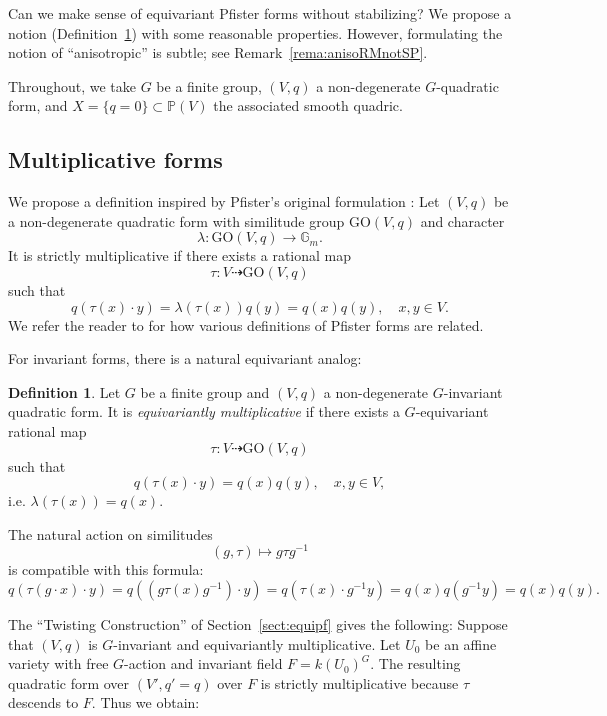 \documentclass[12pt]{amsart}
\numberwithin{equation}{section}
\newcommand{\ra}{\rightarrow}
\newcommand{\bG}{\mathbb{G}}
\newcommand{\bP}{\mathbb{P}}
\newcommand{\GO}{\mathrm{GO}}
\theoremstyle{plain}
\theoremstyle{definition}
\newtheorem{defi}[prop]{Definition}
\theoremstyle{remark}
\begin{document}
Can we make sense of equivariant Pfister forms without
stabilizing? We propose a notion (Definition~\ref{defn:equmult}) with some reasonable
properties. However, formulating the notion of ``anisotropic''
is subtle; see Remark~\ref{rema:anisoRMnotSP}.

Throughout, we take $G$ be a finite group, $(V,q)$ a non-degenerate $G$-quadratic form, and
$
X=\{q=0\}\subset \bP(V)
$ 
the associated smooth quadric. 





\subsection*{Multiplicative forms}
We propose a definition inspired by
Pfister's original formulation \cite[ch.~2]{Pfisterbook}:
Let $(V,q)$ be a non-degenerate quadratic form with similitude group
$\GO(V,q)$ and character 
$$
\lambda: \GO(V,q) \ra \bG_m.
$$
It is strictly multiplicative if there exists a rational map
$$\tau: V \dashrightarrow \GO(V,q)$$
such that 
$$q(\tau(x)\cdot y)=\lambda(\tau(x)) q(y) = q(x)q(y), \quad x,y \in V.$$
We refer the reader to \cite[\S{23}]{EKMbook} for how various definitions of Pfister forms are related.

For invariant forms, there is a natural equivariant analog:
\begin{defi}
\label{defn:equmult}
Let $G$ be a finite group and $(V,q)$ a non-degenerate $G$-invariant
quadratic form.
It is {\em equivariantly multiplicative}
if there exists a $G$-equivariant rational map
$$
\tau:V \dashrightarrow \GO(V,q)
$$
such that 
\begin{equation} \label{taufunc}
q(\tau(x)\cdot y) = q(x)q(y), \quad x,y \in V,
\end{equation}
i.e. $\lambda(\tau(x))=q(x)$.  
\end{defi}
The natural action on similitudes
$$(g,\tau) \mapsto g \tau g^{-1}$$
is compatible with this formula:
$$
q(\tau(g\cdot x)\cdot y)\!=\!q((g \tau(x) g^{-1})\cdot y)\!=\!q(\tau(x) \cdot g^{-1}y)\!=\!
q(x)q(g^{-1}y)=q(x)q(y).
$$

The ``Twisting Construction'' of Section~\ref{sect:equipf}
gives the following:
Suppose that $(V,q)$ is $G$-invariant and equivariantly
multiplicative. 
Let $U_0$ be an affine variety with free $G$-action 
and invariant field $F=k(U_0)^G$. The resulting quadratic form
over $(V',q'=q)$ over $F$ is strictly multiplicative because
$\tau$ descends to $F$.  Thus we obtain:
\end{document}
